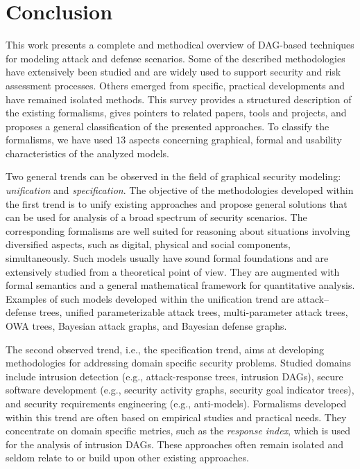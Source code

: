\documentclass[a4paper]{article}
\begin{document}
\section{Conclusion} \label{sec:conclusion}

This work presents a complete and methodical overview of DAG-based techniques
for modeling attack and defense scenarios. Some of the described methodologies
have extensively been studied and are widely used to support security and risk
assessment processes. Others emerged from specific, practical developments and 
have remained isolated methods. This survey provides a structured description of
the existing formalisms, gives pointers to related papers, tools and projects,
and proposes a general classification of the presented approaches. To classify
the formalisms, we have used $13$ aspects concerning graphical, formal and
usability characteristics of the analyzed models.

Two general trends can be observed in the field of graphical security modeling:
\emph{unification} and \emph{specification}. The objective of the methodologies
developed within the first trend is to unify existing approaches and propose
general solutions that can be used for analysis of a broad spectrum of security 
scenarios. The corresponding formalisms are well suited for reasoning about
situations involving diversified aspects, such as digital, physical and social
components, simultaneously. Such models usually have sound formal foundations
and are extensively studied from a theoretical point of view. They are augmented
with formal semantics and a general mathematical framework for quantitative
analysis. Examples of such models developed within the unification trend are
attack--defense trees, unified parameterizable attack trees, multi-parameter
attack trees, OWA trees, Bayesian attack graphs, and Bayesian defense graphs.

The second observed trend, i.e., the specification trend, aims at developing 
methodologies for addressing domain specific security problems. Studied domains
include intrusion detection (e.g., attack-response trees, intrusion DAGs),
secure software development (e.g., security activity graphs, security goal
indicator trees), and security requirements engineering (e.g., anti-models).
Formalisms developed within this trend are often based on empirical studies and
practical needs. They concentrate on domain specific  metrics, such as the
\emph{response index}, which is used for the analysis of intrusion DAGs. These
approaches often remain isolated and seldom relate to or build upon other
existing approaches.
\end{document}
